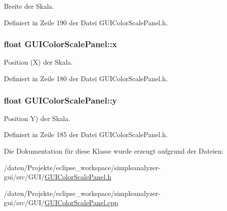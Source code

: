 Breite der Skala. 



Definiert in Zeile 190 der Datei G\-U\-I\-Color\-Scale\-Panel.\-h.

\hypertarget{classGUIColorScalePanel_a41599e2046e6766d5276c95d4aa54ad3}{
\subsubsection[{x}]{\setlength{\rightskip}{0pt plus 5cm}float G\-U\-I\-Color\-Scale\-Panel\-::x\hspace{0.3cm}{\ttfamily [private]}}}\label{classGUIColorScalePanel_a41599e2046e6766d5276c95d4aa54ad3}


Position (X) der Skala. 



Definiert in Zeile 180 der Datei G\-U\-I\-Color\-Scale\-Panel.\-h.

\hypertarget{classGUIColorScalePanel_a5a33f7666c1c49ca8cfe2e4de3dd06e0}{
\subsubsection[{y}]{\setlength{\rightskip}{0pt plus 5cm}float G\-U\-I\-Color\-Scale\-Panel\-::y\hspace{0.3cm}{\ttfamily [private]}}}\label{classGUIColorScalePanel_a5a33f7666c1c49ca8cfe2e4de3dd06e0}


Position Y) der Skala. 



Definiert in Zeile 185 der Datei G\-U\-I\-Color\-Scale\-Panel.\-h.



Die Dokumentation für diese Klasse wurde erzeugt aufgrund der Dateien\-:\begin{DoxyCompactItemize}
\item 
/daten/\-Projekte/eclipse\-\_\-workspace/simpleanalyzer-\/gui/src/\-G\-U\-I/\hyperlink{GUIColorScalePanel_8h}{G\-U\-I\-Color\-Scale\-Panel.\-h}\item 
/daten/\-Projekte/eclipse\-\_\-workspace/simpleanalyzer-\/gui/src/\-G\-U\-I/\hyperlink{GUIColorScalePanel_8cpp}{G\-U\-I\-Color\-Scale\-Panel.\-cpp}\end{DoxyCompactItemize}

